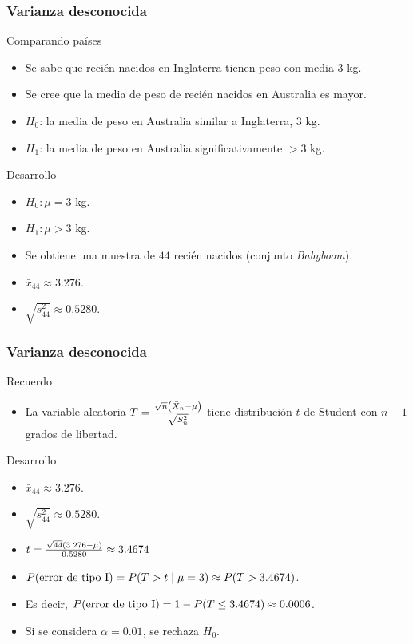 \documentclass[table]{beamer}
\begin{document}
\begin{frame}
    \frametitle{Varianza desconocida}
    \begin{exampleblock}{Comparando países}
        \begin{itemize}
            \item Se sabe que recién nacidos en Inglaterra tienen peso con media $3$ kg.
            \item Se cree que la media de peso de recién nacidos en Australia es mayor.
            \item $H_{0}$: la media de peso en Australia similar a Inglaterra, $3$ kg.
            \item $H_{1}$: la media de peso en Australia significativamente $>3$ kg.
        \end{itemize}
    \end{exampleblock}
    \begin{block}{Desarrollo}
        \begin{itemize}
            \item $H_{0}: \mu = 3$ kg.
            \item $H_{1}: \mu > 3$ kg.
            \item Se obtiene una muestra de $44$ recién nacidos (conjunto \emph{Babyboom}).
            \item $\bar{x}_{44} \approx 3.276$.
            \item $\sqrt{s^{2}_{44}} \approx 0.5280$.
        \end{itemize}
    \end{block}
\end{frame}

\begin{frame}
    \frametitle{Varianza desconocida}
    \begin{block}{Recuerdo}
        \begin{itemize}
            \item La variable aleatoria $T = \frac{\sqrt{n} \parens{\bar{X}_{n} - \mu}}{\sqrt{S^{2}_{n}}}$ tiene distribución $t$ de Student con $n - 1$ grados de libertad.
        \end{itemize}
    \end{block}
    \begin{block}{Desarrollo}
        \begin{itemize}
            \item $\bar{x}_{44} \approx 3.276$.
            \item $\sqrt{s^{2}_{44}} \approx 0.5280$.
            \item $t = \frac{\sqrt{44} \parens{3.276 - \mu}}{0.5280} \approx 3.4674$
            \item $\prob{\text{error de tipo I}} = \prob{T > t \mid \mu = 3} \approx \prob{T > 3.4674}$.
            \item Es decir, $\prob{\text{error de tipo I}} = 1 - \prob{T \leq 3.4674} \approx 0.0006$.
            \item Si se considera $\alpha = 0.01$, se rechaza $H_{0}$.
        \end{itemize}
    \end{block}
\end{frame}
\end{document}
